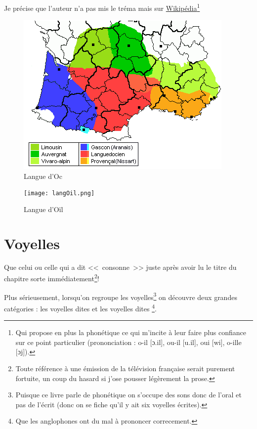\documentclass[12pt,a4paper]{book}
\newcommand{\exFR}[1]{%
  \textcolor{olive}{\textcursive{#1}}}
\begin{document}
Je précise que l'auteur n'a pas mis le tréma mais sur
\href{https://fr.wikipedia.org/wiki/Langue_d\%27o\%C3\%AFl}{Wikipédia}\footnote{Qui propose en plus la phonétique ce qui m'incite à
  leur faire plus confiance sur ce point particulier (prononciation :
  o-il [ɔ.il], ou-il [u.il], oui [wi], o-ille [ɔj]).}


\begin{subfigures}
  \label{fig:fig4a5}
  \begin{figure}
    \centering
    \includegraphics[scale=.725]{langOc.png}
    \caption{Langue d'Oc}
    \label{fig:fig4}
  \end{figure}
  \begin{figure}
    \centering
    \texttt{[image: langOil.png]}
    \caption{Langue d'Oïl}
    \label{fig:fig5}
  \end{figure}
\end{subfigures}






  
\chapter{Voyelles}\label{chap:voy}
Que celui ou celle qui a dit <<~consonne~>> juste après avoir lu le
titre du chapitre sorte immédiatement\footnote{Toute référence à une
  émission de la télévision française serait purement fortuite, un
  coup du hasard si j'ose pousser légèrement la prose.}!\par
Plus sérieusement, lorsqu'on regroupe les voyelles\footnote{Puisque ce
  livre parle de phonétique on s'occupe des sons donc de l'oral et pas
  de l'écrit (donc on se fiche qu'il y ait six voyelles écrites).} on
découvre deux grandes catégories : les voyelles dites \exFR{Orales} et
les voyelles dites \exFR{Nasales}\footnote{Que les anglophones ont du
  mal à prononcer correcement.}.
\end{document}
